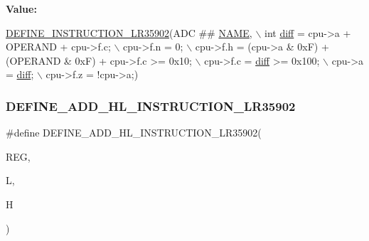 {\bfseries Value\+:}
\begin{DoxyCode}
\mbox{\hyperlink{isa-lr35902_8c_a3128fc43c5d01e8b51f67901c0b4b5ef}{DEFINE\_INSTRUCTION\_LR35902}}(ADC ## \mbox{\hyperlink{inflate_8h_a164ea0159d5f0b5f12a646f25f99eceaa67bc2ced260a8e43805d2480a785d312}{NAME}}, \(\backslash\)
        \textcolor{keywordtype}{int} \mbox{\hyperlink{isa-lr35902_8c_a65f3a8178e1f997a7a19a988bb0f4e1a}{diff}} = cpu->a + OPERAND + cpu->f.c; \(\backslash\)
        cpu->f.n = 0; \(\backslash\)
        cpu->f.h = (cpu->a & 0xF) + (OPERAND & 0xF) + cpu->f.c >= 0x10; \(\backslash\)
        cpu->f.c = \mbox{\hyperlink{isa-lr35902_8c_a65f3a8178e1f997a7a19a988bb0f4e1a}{diff}} >= 0x100; \(\backslash\)
        cpu->a = \mbox{\hyperlink{isa-lr35902_8c_a65f3a8178e1f997a7a19a988bb0f4e1a}{diff}}; \(\backslash\)
        cpu->f.z = !cpu->a;)
\end{DoxyCode}
\mbox{\label{isa-lr35902_8c_ad25f2cae8cbf7b4216dc4edaec3b3fba}} 
\subsubsection{\texorpdfstring{D\+E\+F\+I\+N\+E\+\_\+\+A\+D\+D\+\_\+\+H\+L\+\_\+\+I\+N\+S\+T\+R\+U\+C\+T\+I\+O\+N\+\_\+\+L\+R35902}{DEFINE\_ADD\_HL\_INSTRUCTION\_LR35902}}
{\footnotesize\ttfamily \#define D\+E\+F\+I\+N\+E\+\_\+\+A\+D\+D\+\_\+\+H\+L\+\_\+\+I\+N\+S\+T\+R\+U\+C\+T\+I\+O\+N\+\_\+\+L\+R35902(\begin{DoxyParamCaption}\item[{}]{R\+EG,  }\item[{}]{L,  }\item[{}]{H }\end{DoxyParamCaption})}

